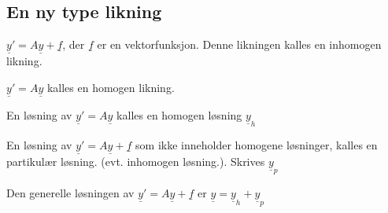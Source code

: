 \documentclass[11pt, a4paper, norsk]{article}
\begin{document}
            \subsection{En ny type likning}%
            \label{sub:en_ny_type_likning}
            
            $\underline{y}' = A\underline{y} + \underline{f}$, der $\underline{f}$ er en vektorfunksjon. Denne likningen kalles en inhomogen likning.

            $\underline{y}' = A\underline{y}$ kalles en homogen likning. 

            En løsning av $\underline{y}' = A\underline{y}$ kalles en homogen løsning $\underline{y}_{h}$

            En løsning av $\underline{y}' = A\underline{y} + \underline{f}$ som ikke inneholder homogene løsninger, kalles en partikulær løsning. (evt. inhomogen løsning.). Skrives $\underline{y}_{p}$

            Den generelle løsningen av $\underline{y}' = A\underline{y} + \underline{f}$ er $\underline{y} = \underline{y}_{h} + \underline{y}_{p}$
\end{document}
